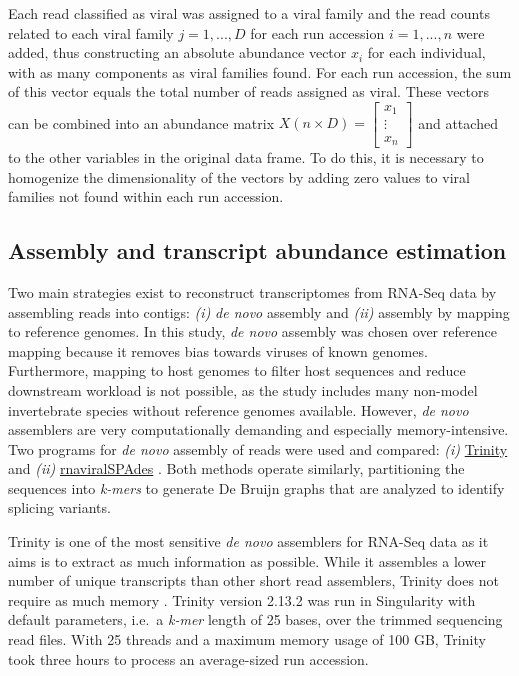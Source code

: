 \documentclass[
  openany]{book}
\begin{document}
Each read classified as viral was assigned to a viral family and the read counts related to each viral family \(j = 1, ..., D\) for each run accession \(i = 1, ..., n\) were added, thus constructing an absolute abundance vector \(x_i\) for each individual, with as many components as viral families found. For each run accession, the sum of this vector equals the total number of reads assigned as viral. These vectors can be combined into an abundance matrix \(X (n \times D) = \begin{bmatrix} x_1 \\ \vdots \\ x_n \end{bmatrix}\) and attached to the other variables in the original data frame. To do this, it is necessary to homogenize the dimensionality of the vectors by adding zero values to viral families not found within each run accession.

\hypertarget{assembly-and-transcript-abundance-estimation}{%
\subsection{Assembly and transcript abundance estimation}\label{assembly-and-transcript-abundance-estimation}}

Two main strategies exist to reconstruct transcriptomes from RNA-Seq data by assembling reads into contigs: \emph{(i)} \emph{de novo} assembly and \emph{(ii)} assembly by mapping to reference genomes. In this study, \emph{de novo} assembly was chosen over reference mapping because it removes bias towards viruses of known genomes. Furthermore, mapping to host genomes to filter host sequences and reduce downstream workload is not possible, as the study includes many non-model invertebrate species without reference genomes available. However, \emph{de novo} assemblers are very computationally demanding and especially memory-intensive. Two programs for \emph{de novo} assembly of reads were used and compared: \emph{(i)} \href{https://github.com/trinityrnaseq/trinityrnaseq}{Trinity} \autocite{Grabherr2011} and \emph{(ii)} \href{https://github.com/ablab/spades}{rnaviralSPAdes} \autocite{Meleshko2021}. Both methods operate similarly, partitioning the sequences into \emph{k-mers} to generate De Bruijn graphs that are analyzed to identify splicing variants.

Trinity is one of the most sensitive \emph{de novo} assemblers for RNA-Seq data as it aims is to extract as much information as possible. While it assembles a lower number of unique transcripts than other short read assemblers, Trinity does not require as much memory \autocite{Sze2017}. Trinity version 2.13.2 was run in Singularity with default parameters, i.e.~a \emph{k-mer} length of 25 bases, over the trimmed sequencing read files. With 25 threads and a maximum memory usage of 100 GB, Trinity took three hours to process an average-sized run accession.
\end{document}
